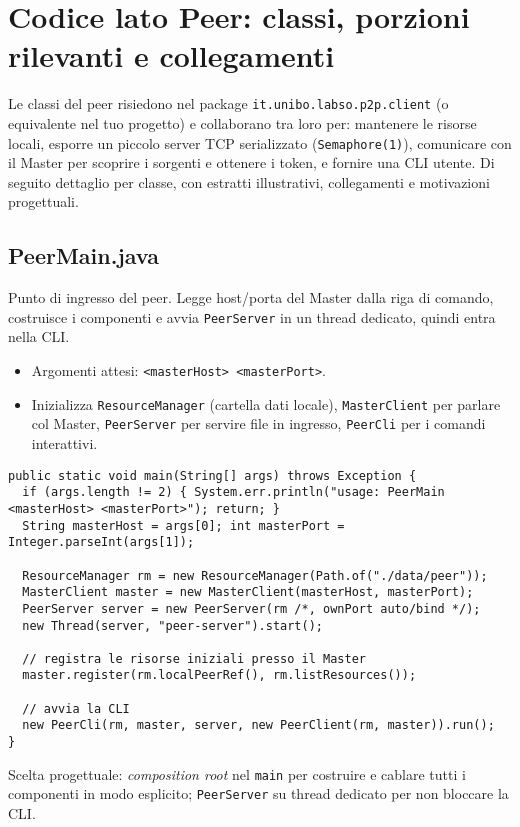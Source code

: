 \documentclass[a4paper,12pt]{article}
\begin{document}
\section{Codice lato Peer: classi, porzioni rilevanti e collegamenti}

Le classi del peer risiedono nel package \texttt{it.unibo.labso.p2p.client} (o equivalente nel tuo progetto) e collaborano tra loro per: mantenere le risorse locali, esporre un piccolo server TCP serializzato (\texttt{Semaphore(1)}), comunicare con il Master per scoprire i sorgenti e ottenere i token, e fornire una CLI utente. Di seguito dettaglio per classe, con estratti illustrativi, collegamenti e motivazioni progettuali.

\subsection*{PeerMain.java}
Punto di ingresso del peer. Legge host/porta del Master dalla riga di comando, costruisce i componenti e avvia \texttt{PeerServer} in un thread dedicato, quindi entra nella CLI.
\begin{itemize}[nosep]
  \item Argomenti attesi: \texttt{<masterHost> <masterPort>}.
  \item Inizializza \texttt{ResourceManager} (cartella dati locale), \texttt{MasterClient} per parlare col Master, \texttt{PeerServer} per servire file in ingresso, \texttt{PeerCli} per i comandi interattivi.
\end{itemize}

\begin{lstlisting}
public static void main(String[] args) throws Exception {
  if (args.length != 2) { System.err.println("usage: PeerMain <masterHost> <masterPort>"); return; }
  String masterHost = args[0]; int masterPort = Integer.parseInt(args[1]);

  ResourceManager rm = new ResourceManager(Path.of("./data/peer"));
  MasterClient master = new MasterClient(masterHost, masterPort);
  PeerServer server = new PeerServer(rm /*, ownPort auto/bind */);
  new Thread(server, "peer-server").start();

  // registra le risorse iniziali presso il Master
  master.register(rm.localPeerRef(), rm.listResources());

  // avvia la CLI
  new PeerCli(rm, master, server, new PeerClient(rm, master)).run();
}
\end{lstlisting}

Scelta progettuale: \emph{composition root} nel \texttt{main} per costruire e cablare tutti i componenti in modo esplicito; \texttt{PeerServer} su thread dedicato per non bloccare la CLI.
\end{document}
